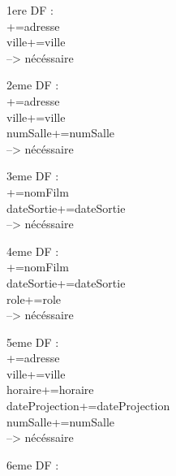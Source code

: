 \documentclass[a4paper,sffamily,12pt]{article}
\begin{document}
\noindent1ere DF :\\

+={adresse} \\
{ville}+={ville} \\
--> nécéssaire \\

\vspace{0.5cm}

\noindent2eme DF : \\

+={adresse} \\
{ville}+={ville} \\
{numSalle}+={numSalle} \\
--> nécéssaire \\

\vspace{0.5cm}

\noindent3eme DF : \\

+={nomFilm} \\
{dateSortie}+={dateSortie} \\
--> nécéssaire \\

\vspace{0.5cm}

\noindent4eme DF : \\

+={nomFilm} \\
{dateSortie}+={dateSortie} \\
{role}+={role} \\
--> nécéssaire \\

\vspace{0.5cm}

\noindent5eme DF : \\

+={adresse} \\
{ville}+={ville} \\
{horaire}+={horaire} \\
{dateProjection}+={dateProjection} \\
{numSalle}+={numSalle} \\
--> nécéssaire \\

\vspace{0.5cm}

\noindent6eme DF : \\
\end{document}
